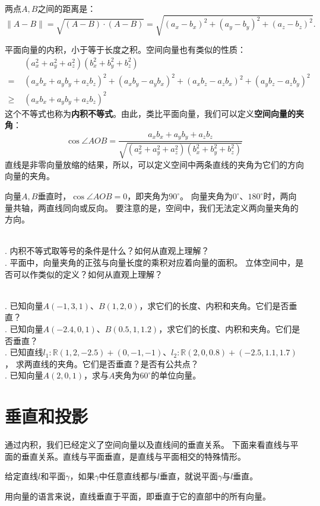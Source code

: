 \documentclass[12pt,UTF8]{ctexbook}
\begin{document}
两点$A,B$之间的距离是：
$$\|A-B\| = \sqrt{(A - B)\cdot(A-B)} = \sqrt{(a_x - b_x)^2 + (a_y-b_y)^2 + (a_z-b_z)^2}. $$

平面向量的内积，小于等于长度之积。空间向量也有类似的性质：
\begin{align*}
    &(a_x^2 + a_y^2 + a_z^2)(b_x^2 + b_y^2 + b_z^2)  \\
    =\,\,& (a_xb_x + a_yb_y + a_zb_z)^2 + (a_xb_y - a_yb_x)^2 + (a_xb_z - a_zb_x)^2 + (a_yb_z - a_zb_y)^2  \\
    \geqslant\,\,& (a_xb_x + a_yb_y + a_zb_z)^2  
\end{align*}
这个不等式也称为\textbf{内积不等式}。由此，类比平面向量，我们可以定义\textbf{空间向量的夹角}：
$$ \cos \angle AOB = \frac{a_xb_x + a_yb_y + a_zb_z}{\sqrt{(a_x^2 + a_y^2 + a_z^2)(b_x^2 + b_y^2 + b_z^2)}}$$
直线是非零向量放缩的结果，所以，可以定义空间中两条直线的夹角为它们的方向向量的夹角。

向量$A,B$垂直时，$\cos \angle AOB = 0$，即夹角为$90^\circ$。
向量夹角为$0^\circ$、$180^\circ$时，两向量共轴，两直线同向或反向。
要注意的是，空间中，我们无法定义两向量夹角的方向。

\begin{sk}
    \mbox{} \\
    . 内积不等式取等号的条件是什么？如何从直观上理解？\\
    . 平面中，向量夹角的正弦与向量长度的乘积对应着向量的面积。
    立体空间中，是否可以作类似的定义？如何从直观上理解？
\end{sk}

\begin{xt}
    \mbox{} \\
    . 已知向量$A(-1, 3, 1)$、$B(1, 2, 0)$，求它们的长度、内积和夹角。它们是否垂直？\\
    . 已知向量$A(-2.4, 0, 1)$、$B(0.5, 1, 1.2)$，求它们的长度、内积和夹角。它们是否垂直？\\
    . 已知直线$l_1: \mathbb{R}(1,2,-2.5) + (0,-1,-1)$、$l_2: \mathbb{R}(2,0,0.8) + (-2.5,1.1,1.7)$，
    求两直线的夹角。它们是否垂直？是否有公共点？\\
    . 已知向量$A(2, 0, 1)$，求与$A$夹角为$60^\circ$的单位向量。
\end{xt}

\section{垂直和投影}

通过内积，我们已经定义了空间向量以及直线间的垂直关系。
下面来看直线与平面的垂直关系。直线与平面垂直，是直线与平面相交的特殊情形。
\begin{df}\label{df:1-3-10}
    给定直线$l$和平面$\gamma$，如果$\gamma$中任意直线都与$l$垂直，就说平面$\gamma$与$l$垂直。
\end{df}
用向量的语言来说，直线垂直于平面，即垂直于它的直部中的所有向量。
\end{document}
